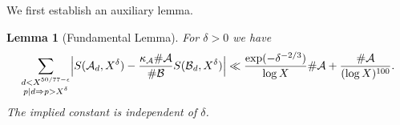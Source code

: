 \documentclass[10pt]{amsart}
\theoremstyle{plain}
\newtheorem{lmm}[thrm]{Lemma}
\numberwithin{sblmm}{thrm}
\numberwithin{equation}{section}
\begin{document}
%
%
%
%
%
%
%
We first establish an auxiliary lemma.%
%
%
%
%
\begin{lmm}[Fundamental Lemma]\label{lmm:FundamentalLemma}
%
For $\delta>0$ we have
\[
\sum_{\substack{d<X^{50/77-\epsilon}\\ p|d\Rightarrow p>X^{\delta} }}\Bigl|S(\mathcal{A}{}_{d}, X^{\delta})-\frac{\kappa_\mathcal{A}\#\mathcal{A}{}}{\#\mathcal{B}{}}S(\mathcal{B}{}_d,X^{\delta})\Bigr|
\ll \frac{\exp(-\delta^{-2/3})}{\log{X}}\#\mathcal{A}+\frac{\#\mathcal{A}}{(\log{X})^{100}}.
\]
The implied constant is independent of $\delta$.
%
\end{lmm}
%
%
%
%
\end{document}
